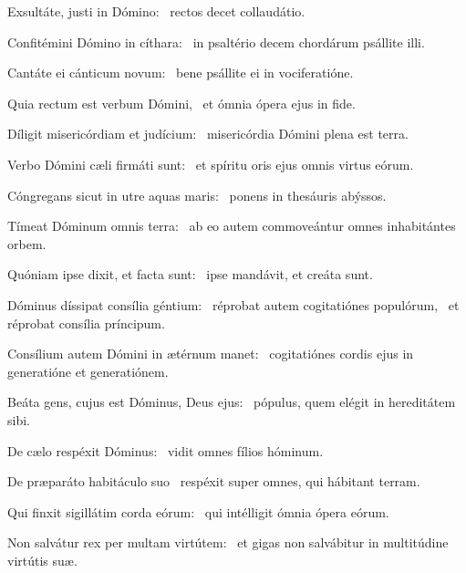 \item Exsultáte, justi in Dómino:~\psstar{} rectos decet collaudátio.

\item Confitémini Dómino in cíthara:~\psstar{} in psaltério decem chordárum psállite illi.

\item Cantáte ei cánticum novum:~\psstar{} bene psállite ei in vociferatióne.

\item Quia rectum est verbum Dómini,~\psstar{} et ómnia ópera ejus in fide.

\item Díligit misericórdiam et judícium:~\psstar{} misericórdia Dómini plena est terra.

\item Verbo Dómini cæli firmáti sunt:~\psstar{} et spíritu oris ejus omnis virtus eórum.

\item Cóngregans sicut in utre aquas maris:~\psstar{} ponens in thesáuris abýssos.

\item Tímeat Dóminum omnis terra:~\psstar{} ab eo autem commoveántur omnes inhabitántes orbem.

\item Quóniam ipse dixit, et facta sunt:~\psstar{} ipse mandávit, et creáta sunt.

\item Dóminus díssipat consília géntium:~\pscross{} réprobat autem cogitatiónes populórum,~\psstar{} et réprobat consília príncipum.

\item Consílium autem Dómini in ætérnum manet:~\psstar{} cogitatiónes cordis ejus in generatióne et generatiónem.

\item Beáta gens, cujus est Dóminus, Deus ejus:~\psstar{} pópulus, quem elégit in hereditátem sibi.

\item De cælo respéxit Dóminus:~\psstar{} vidit omnes fílios hóminum.

\item De præparáto habitáculo suo~\psstar{} respéxit super omnes, qui hábitant terram.

\item Qui finxit sigillátim corda eórum:~\psstar{} qui intélligit ómnia ópera eórum.

\item Non salvátur rex per multam virtútem:~\psstar{} et gigas non salvábitur in multitúdine virtútis suæ.

